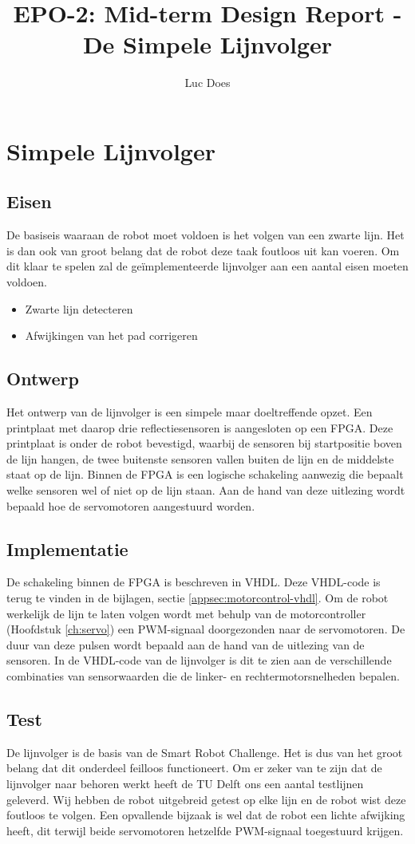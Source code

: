 \documentclass{report}
\title{EPO-2: Mid-term Design Report - De Simpele Lijnvolger}
\author{Luc Does}
\begin{document}
\chapter{Simpele Lijnvolger}
\label{ch:lijnvolger}

\section{Eisen}
De basiseis waaraan de robot moet voldoen is het volgen van een zwarte lijn.
Het is dan ook van groot belang dat de robot deze taak foutloos uit kan voeren.
Om dit klaar te spelen zal de geïmplementeerde lijnvolger aan een aantal eisen moeten voldoen.

\begin{itemize}
\item Zwarte lijn detecteren
\item Afwijkingen van het pad corrigeren
\end{itemize}

\section{Ontwerp}
Het ontwerp van de lijnvolger is een simpele maar doeltreffende opzet.
Een printplaat met daarop drie reflectiesensoren is aangesloten op een FPGA.
Deze printplaat is onder de robot bevestigd, waarbij de sensoren bij startpositie boven de lijn hangen, de twee buitenste sensoren vallen buiten de lijn en de middelste staat op de lijn.
Binnen de FPGA is een logische schakeling aanwezig die bepaalt welke sensoren wel of niet op de lijn staan.
Aan de hand van deze uitlezing wordt bepaald hoe de servomotoren aangestuurd worden.

\section{Implementatie}
De schakeling binnen de FPGA is beschreven in VHDL.
Deze VHDL-code is terug te vinden in de bijlagen, sectie \ref{appsec:motorcontrol-vhdl}.
Om de robot werkelijk de lijn te laten volgen wordt met behulp van de motorcontroller (Hoofdstuk \ref{ch:servo}) een PWM-signaal doorgezonden naar de servomotoren.
De duur van deze pulsen wordt bepaald aan de hand van de uitlezing van de sensoren.
In de VHDL-code van de lijnvolger is dit te zien aan de verschillende combinaties van sensorwaarden die de linker- en rechtermotorsnelheden bepalen.

\section{Test}
De lijnvolger is de basis van de Smart Robot Challenge.
Het is dus van het groot belang dat dit onderdeel feilloos functioneert.
Om er zeker van te zijn dat de lijnvolger naar behoren werkt heeft de TU Delft ons een aantal testlijnen geleverd.
Wij hebben de robot uitgebreid getest op elke lijn en de robot wist deze foutloos te volgen.
Een opvallende bijzaak is wel dat de robot een lichte afwijking heeft, dit terwijl beide servomotoren hetzelfde PWM-signaal toegestuurd krijgen.
\end{document}
